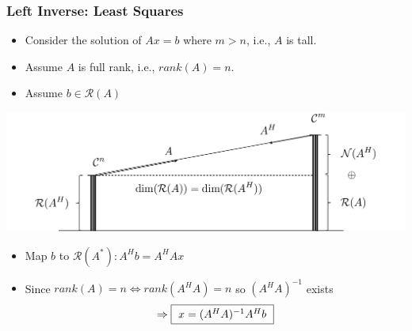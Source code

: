 \documentclass{beamer}
\begin{document}
%		
%

\begin{frame}\frametitle{Left Inverse: Least Squares}
	\begin{itemize}
		\item 	Consider the solution of $Ax=b$ where $m>n$, i.e., $A$ is tall.
		\item Assume $A$ is full rank, i.e., $rank(A)=n$.
		\item Assume $b \in \mathcal{R}(A)$
	\end{itemize}
	\begin{center}
		\includegraphics[width=\textwidth]{figures/chap4_least_squares}
	\end{center}
	
	\begin{itemize}
		\item Map $b$ to $\mathcal{R}(A^\ast) :  A^Hb = A^HAx$
		\item Since $rank(A) = n \iff rank(A^HA) = n$ so $(A^HA)^{-1}$ exists
			\[ \Rightarrow \fbox{ $x = (A^HA)^{-1}A^Hb$ } \]
	\end{itemize}
\end{frame}
\end{document}
